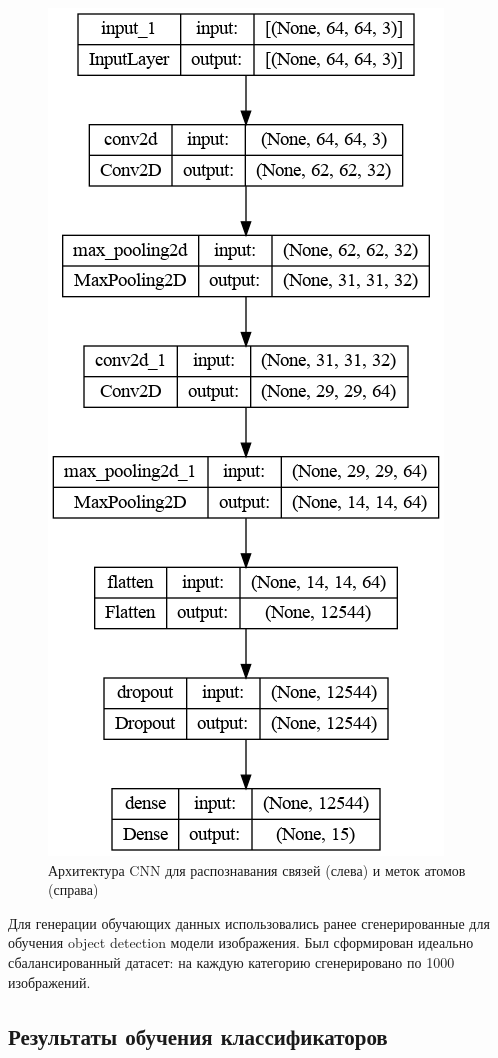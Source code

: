 \begin{figure}[h!]
	\includegraphics [scale=0.3] {my_folder/images/model_atom}
	\caption{Архитектура CNN для распознавания связей (слева) и меток атомов (справа)}
	\label{fig:AP50_modelbondatom}
\end{figure}

Для генерации обучающих данных использовались ранее сгенерированные для обучения object detection модели изображения. Был сформирован идеально сбалансированный датасет: на каждую категорию сгенерировано по 1000 изображений.

\subsection{Результаты обучения классификаторов}

